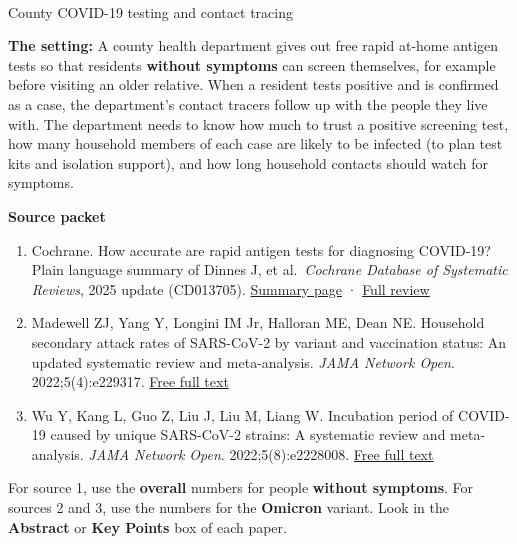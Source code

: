 \documentclass[
  letterpaper,
  DIV=11,
  numbers=noendperiod]{scrartcl}
\makeatletter
\let\oldparagraph\paragraph
\renewcommand{\paragraph}{
    \@ifstar
      \xxxParagraphStar
      \xxxParagraphNoStar
  }
\newcommand{\xxxParagraphStar}[1]{\oldparagraph*{#1}\mbox{}}
\newcommand{\xxxParagraphNoStar}[1]{\oldparagraph{#1}\mbox{}}
\providecommand{\tightlist}{%
  \setlength{\itemsep}{0pt}\setlength{\parskip}{0pt}}
\makeatother
\begin{document}
\paragraph{County COVID-19 testing and contact
tracing}\label{county-covid-19-testing-and-contact-tracing}

\textbf{The setting:} A county health department gives out free rapid
at-home antigen tests so that residents \textbf{without symptoms} can
screen themselves, for example before visiting an older relative. When a
resident tests positive and is confirmed as a case, the department's
contact tracers follow up with the people they live with. The department
needs to know how much to trust a positive screening test, how many
household members of each case are likely to be infected (to plan test
kits and isolation support), and how long household contacts should
watch for symptoms.

\textbf{Source packet}

\begin{enumerate}
\def\labelenumi{\arabic{enumi}.}
\tightlist
\item
  Cochrane. How accurate are rapid antigen tests for diagnosing
  COVID-19? Plain language summary of Dinnes J, et al.~\emph{Cochrane
  Database of Systematic Reviews}, 2025 update (CD013705).
  \href{https://www.cochrane.org/evidence/CD013705_how-accurate-are-rapid-antigen-tests-diagnosing-covid-19}{Summary
  page} ·
  \href{https://www.cochranelibrary.com/cdsr/doi/10.1002/14651858.CD013705.pub4/full}{Full
  review}
\item
  Madewell ZJ, Yang Y, Longini IM Jr, Halloran ME, Dean NE. Household
  secondary attack rates of SARS-CoV-2 by variant and vaccination
  status: An updated systematic review and meta-analysis. \emph{JAMA
  Network Open}. 2022;5(4):e229317.
  \href{https://pmc.ncbi.nlm.nih.gov/articles/PMC9051991/}{Free full
  text}
\item
  Wu Y, Kang L, Guo Z, Liu J, Liu M, Liang W. Incubation period of
  COVID-19 caused by unique SARS-CoV-2 strains: A systematic review and
  meta-analysis. \emph{JAMA Network Open}. 2022;5(8):e2228008.
  \href{https://jamanetwork.com/journals/jamanetworkopen/fullarticle/2795489}{Free
  full text}
\end{enumerate}

For source 1, use the \textbf{overall} numbers for people
\textbf{without symptoms}. For sources 2 and 3, use the numbers for the
\textbf{Omicron} variant. Look in the \textbf{Abstract} or \textbf{Key
Points} box of each paper.
\end{document}
